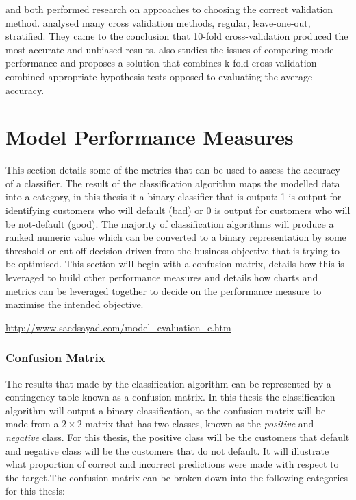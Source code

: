 \citep{kohavi_study_1995} and \citep{salzberg_comparing_1997} both performed research on approaches to choosing the correct validation method. \cite{kohavi_study_1995} analysed many cross validation methods, regular, leave-one-out, stratified. They came to the conclusion that 10-fold cross-validation produced the most accurate and unbiased results. \cite{salzberg_comparing_1997} also studies the issues of comparing model performance and proposes a solution that combines k-fold cross validation combined appropriate hypothesis tests opposed to evaluating the average accuracy.   



\section{Model Performance Measures}\label{modelPerformMeasure}

This section details some of the metrics that can be used to assess the accuracy of a classifier. The result of the classification algorithm maps the modelled data into a category, in this thesis it a binary classifier that is output: 1 is output for identifying customers who will default (bad) or 0 is output for customers who will be not-default (good). The majority of classification algorithms will produce a ranked numeric value which can be converted to a binary representation by some threshold or cut-off decision driven from  the business objective that is trying to be optimised. This section will begin with a confusion matrix, details how this is leveraged to build other performance measures and details how charts and metrics can be leveraged together to decide on the performance measure to maximise the intended objective.

\url{http://www.saedsayad.com/model_evaluation_c.htm}

\subsubsection{Confusion Matrix}

The results that made by the classification algorithm can be represented by a contingency table known as a confusion matrix. In this thesis the classification algorithm will output a binary classification, so the confusion matrix will be made from a $2 \times 2$ matrix that has two classes, known as the \textit{positive} and \textit{negative} class. For this thesis, the positive class will be the customers that default and negative class will be the customers that do not default. It will illustrate what proportion of correct and incorrect predictions were made with respect to the target.The confusion matrix can be broken down into the following categories for this thesis:

